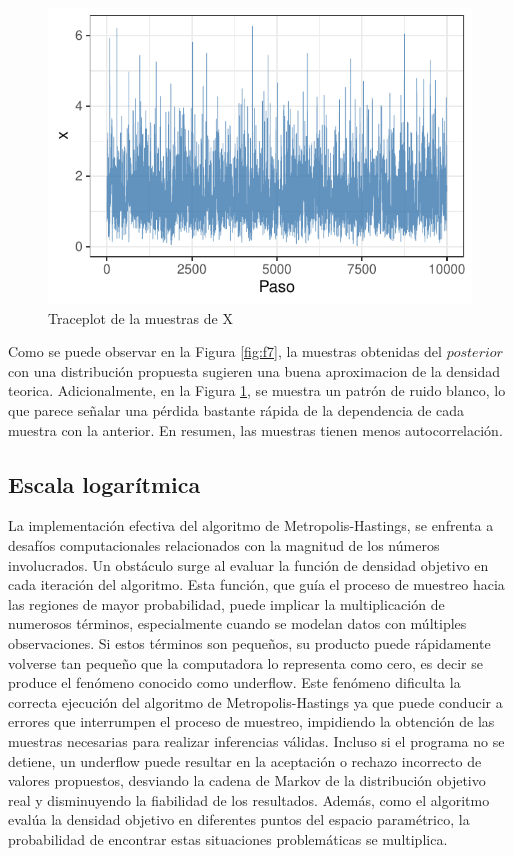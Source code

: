 \documentclass[
]{article}
\begin{document}
\begin{figure}

{\centering \includegraphics{TP-2---El-Dibu-de-la-vida_files/figure-latex/f8-1} 

}

\caption{Traceplot de la muestras de X}\label{fig:f8}
\end{figure}

Como se puede observar en la Figura \ref{fig:f7}, la muestras obtenidas del \(posterior\) con una distribución propuesta sugieren una buena aproximacion de la densidad teorica. Adicionalmente, en la Figura \ref{fig:f8}, se muestra un patrón de ruido blanco, lo que parece señalar una pérdida bastante rápida de la dependencia de cada muestra con la anterior. En resumen, las muestras tienen menos autocorrelación.

\subsection{Escala logarítmica}\label{escala-logaruxedtmica}

La implementación efectiva del algoritmo de Metropolis-Hastings, se enfrenta a desafíos computacionales relacionados con la magnitud de los números involucrados. Un obstáculo surge al evaluar la función de densidad objetivo en cada iteración del algoritmo. Esta función, que guía el proceso de muestreo hacia las regiones de mayor probabilidad, puede implicar la multiplicación de numerosos términos, especialmente cuando se modelan datos con múltiples observaciones. Si estos términos son pequeños, su producto puede rápidamente volverse tan pequeño que la computadora lo representa como cero, es decir se produce el fenómeno conocido como underflow. Este fenómeno dificulta la correcta ejecución del algoritmo de Metropolis-Hastings ya que puede conducir a errores que interrumpen el proceso de muestreo, impidiendo la obtención de las muestras necesarias para realizar inferencias válidas. Incluso si el programa no se detiene, un underflow puede resultar en la aceptación o rechazo incorrecto de valores propuestos, desviando la cadena de Markov de la distribución objetivo real y disminuyendo la fiabilidad de los resultados. Además, como el algoritmo evalúa la densidad objetivo en diferentes puntos del espacio paramétrico, la probabilidad de encontrar estas situaciones problemáticas se multiplica.
\end{document}
